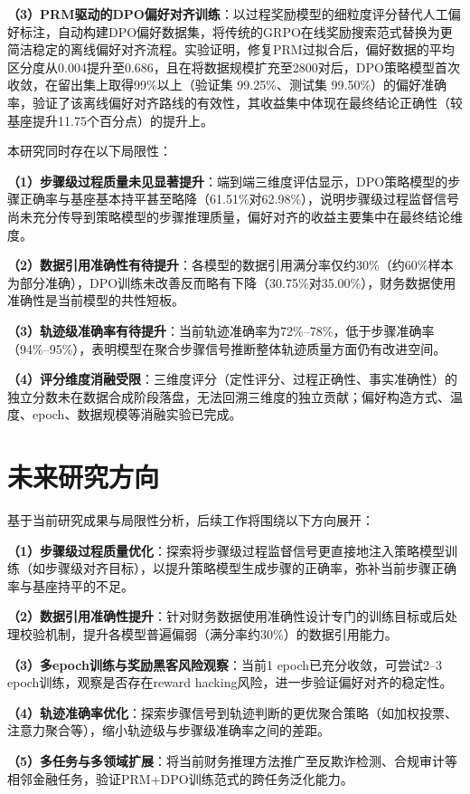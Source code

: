 \documentclass[professional,privacy,print,win,long,STEM,AutoFakeBold]{def/buaa}
\begin{document}
\textbf{（3）PRM驱动的DPO偏好对齐训练}：以过程奖励模型的细粒度评分替代人工偏好标注，自动构建DPO偏好数据集，将传统的GRPO在线奖励搜索范式替换为更简洁稳定的离线偏好对齐流程。实验证明，修复PRM过拟合后，偏好数据的平均区分度从0.004提升至0.686，且在将数据规模扩充至2800对后，DPO策略模型首次收敛，在留出集上取得99\%以上（验证集 99.25\%、测试集 99.50\%）的偏好准确率，验证了该离线偏好对齐路线的有效性，其收益集中体现在最终结论正确性（较基座提升11.75个百分点）的提升上。

本研究同时存在以下局限性：

\textbf{（1）步骤级过程质量未见显著提升}：端到端三维度评估显示，DPO策略模型的步骤正确率与基座基本持平甚至略降（61.51\%对62.98\%），说明步骤级过程监督信号尚未充分传导到策略模型的步骤推理质量，偏好对齐的收益主要集中在最终结论维度。

\textbf{（2）数据引用准确性有待提升}：各模型的数据引用满分率仅约30\%（约60\%样本为部分准确），DPO训练未改善反而略有下降（30.75\%对35.00\%），财务数据使用准确性是当前模型的共性短板。

\textbf{（3）轨迹级准确率有待提升}：当前轨迹准确率为72\%--78\%，低于步骤准确率（94\%--95\%），表明模型在聚合步骤信号推断整体轨迹质量方面仍有改进空间。

\textbf{（4）评分维度消融受限}：三维度评分（定性评分、过程正确性、事实准确性）的独立分数未在数据合成阶段落盘，无法回溯三维度的独立贡献；偏好构造方式、温度、epoch、数据规模等消融实验已完成。

\section{未来研究方向}

基于当前研究成果与局限性分析，后续工作将围绕以下方向展开：

\textbf{（1）步骤级过程质量优化}：探索将步骤级过程监督信号更直接地注入策略模型训练（如步骤级对齐目标），以提升策略模型生成步骤的正确率，弥补当前步骤正确率与基座持平的不足。

\textbf{（2）数据引用准确性提升}：针对财务数据使用准确性设计专门的训练目标或后处理校验机制，提升各模型普遍偏弱（满分率约30\%）的数据引用能力。

\textbf{（3）多epoch训练与奖励黑客风险观察}：当前1 epoch已充分收敛，可尝试2--3 epoch训练，观察是否存在reward hacking风险，进一步验证偏好对齐的稳定性。

\textbf{（4）轨迹准确率优化}：探索步骤信号到轨迹判断的更优聚合策略（如加权投票、注意力聚合等），缩小轨迹级与步骤级准确率之间的差距。

\textbf{（5）多任务与多领域扩展}：将当前财务推理方法推广至反欺诈检测、合规审计等相邻金融任务，验证PRM+DPO训练范式的跨任务泛化能力。


\newpage
{}

\vspace{5cm}
\end{document}
